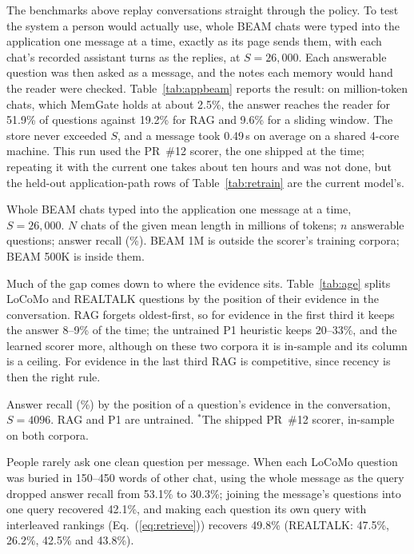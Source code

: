 The benchmarks above replay conversations straight through the policy. To
test the system a person would actually use, whole BEAM chats were typed into the application
one message at a time, exactly as its page sends them, with each chat's
recorded assistant turns as the replies, at $S=26{,}000$. Each answerable
question was then asked as a message, and the notes each memory would hand
the reader were checked. Table~\ref{tab:appbeam} reports the result: on
million-token chats, which MemGate holds at about 2.5\%, the answer reaches
the reader for 51.9\% of questions against 19.2\% for RAG and 9.6\% for a
sliding window. The store never exceeded $S$, and a message took 0.49\,s on
average on a shared 4-core machine. This run used the PR~\#12 scorer, the one
shipped at the time; repeating it with the current one takes about ten hours
and was not done, but the held-out application-path rows of
Table~\ref{tab:retrain} are the current model's.

\begin{table}[t]
\caption{Whole BEAM chats typed into the application one message at a time,
$S=26{,}000$. $N$ chats of the given mean length in millions of tokens; $n$
answerable questions; answer recall (\%). BEAM 1M is outside the scorer's
training corpora; BEAM 500K is inside them.}
\label{tab:appbeam}
\centering
\small
\begin{adjustbox}{max width=\columnwidth}\end{adjustbox}
\end{table}

Much of the gap comes down to where the evidence sits. Table~\ref{tab:age} splits
LoCoMo and REALTALK questions by the position of their evidence in the
conversation. RAG forgets oldest-first, so for evidence in the first third it
keeps the answer 8--9\% of the time; the untrained P1 heuristic keeps 20--33\%,
and the learned scorer more, although on these two corpora it is in-sample
and its column is a ceiling. For evidence in the last third RAG is
competitive, since recency is then the right rule.

\begin{table}[t]
\caption{Answer recall (\%) by the position of a question's evidence in the
conversation, $S=4096$. RAG and P1 are untrained. $^\ast$The shipped PR~\#12
scorer, in-sample on both corpora.}
\label{tab:age}
\centering
\small

\end{table}

People rarely ask one clean question per message. When each LoCoMo question
was buried in 150--450 words of other chat, using the whole message as the
query dropped answer recall from 53.1\% to 30.3\%; joining the message's
questions into one query recovered 42.1\%, and making each question its own
query with interleaved rankings (Eq.~(\ref{eq:retrieve})) recovers 49.8\%
(REALTALK: 47.5\%, 26.2\%, 42.5\% and 43.8\%).

